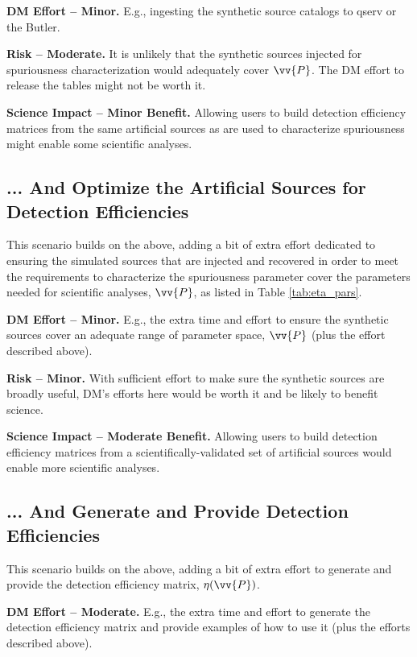 {\bf DM Effort -- Minor.}
E.g., ingesting the synthetic source catalogs to qserv or the Butler.

{\bf Risk -- Moderate.}
It is unlikely that the synthetic sources injected for spuriousness characterization would adequately cover $\vv{P}$.
The DM effort to release the tables might not be worth it.

{\bf Science Impact -- Minor Benefit.}
Allowing users to build detection efficiency matrices from the same artificial sources as are used to characterize spuriousness might enable some scientific analyses.


\subsection{... And Optimize the Artificial Sources for Detection Efficiencies}\label{ssec:opts_2}

This scenario builds on the above, adding a bit of extra effort dedicated to ensuring the simulated sources that are injected and recovered in order to meet the requirements to characterize the spuriousness parameter cover the parameters needed for scientific analyses, $\vv{P}$, as listed in Table \ref{tab:eta_pars}.

{\bf DM Effort -- Minor.}
E.g., the extra time and effort to ensure the synthetic sources cover an adequate range of parameter space, $\vv{P}$ (plus the effort described above).

{\bf Risk -- Minor.}
With sufficient effort to make sure the synthetic sources are broadly useful, DM's efforts here would be worth it and be likely to benefit science.

{\bf Science Impact -- Moderate Benefit.}
Allowing users to build detection efficiency matrices from a scientifically-validated set of artificial sources would enable more scientific analyses.


\subsection{... And Generate and Provide Detection Efficiencies}\label{ssec:opts_3}

This scenario builds on the above, adding a bit of extra effort to generate and provide the detection efficiency matrix, $\eta(\vv{P})$.

{\bf DM Effort -- Moderate.}
E.g., the extra time and effort to generate the detection efficiency matrix and provide examples of how to use it (plus the efforts described above).

